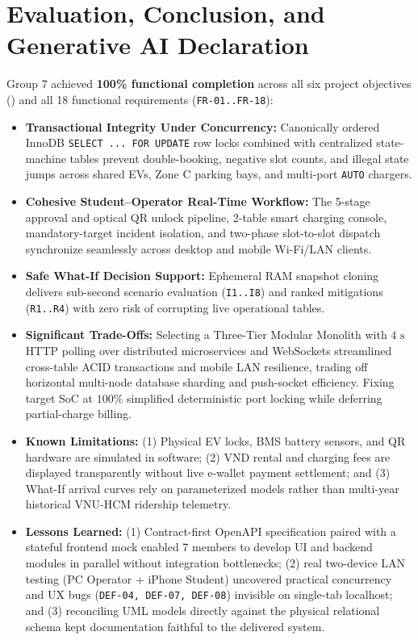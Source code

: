 \section{Evaluation, Conclusion, and Generative AI Declaration}
\label{sec:evaluation}

\label{subsec:evaluation-strengths}
Group 7 achieved \textbf{100\% functional completion} across all six project objectives () and all 18 functional requirements (\texttt{FR-01..FR-18}):
\begin{itemize}
  \item \textbf{Transactional Integrity Under Concurrency:} Canonically ordered InnoDB \texttt{SELECT ... FOR UPDATE} row locks combined with centralized state-machine tables prevent double-booking, negative slot counts, and illegal state jumps across shared EVs, Zone C parking bays, and multi-port \texttt{AUTO} chargers.
  \item \textbf{Cohesive Student--Operator Real-Time Workflow:} The 5-stage approval and optical QR unlock pipeline, 2-table smart charging console, mandatory-target incident isolation, and two-phase slot-to-slot dispatch synchronize seamlessly across desktop and mobile Wi-Fi/LAN clients.
  \item \textbf{Safe What-If Decision Support:} Ephemeral RAM snapshot cloning delivers sub-second scenario evaluation (\texttt{I1..I8}) and ranked mitigations (\texttt{R1..R4}) with zero risk of corrupting live operational tables.
\end{itemize}

\label{subsec:limitations-lessons}
\begin{itemize}
  \item \textbf{Significant Trade-Offs:} Selecting a Three-Tier Modular Monolith with $4\text{ s}$ HTTP polling over distributed microservices and WebSockets streamlined cross-table ACID transactions and mobile LAN resilience, trading off horizontal multi-node database sharding and push-socket efficiency. Fixing target SoC at $100\%$ simplified deterministic port locking while deferring partial-charge billing.
  \item \textbf{Known Limitations:} (1) Physical EV locks, BMS battery sensors, and QR hardware are simulated in software; (2) VND rental and charging fees are displayed transparently without live e-wallet payment settlement; and (3) What-If arrival curves rely on parameterized models rather than multi-year historical VNU-HCM ridership telemetry.
  \item \textbf{Lessons Learned:} (1) Contract-first OpenAPI specification paired with a stateful frontend mock enabled 7 members to develop UI and backend modules in parallel without integration bottlenecks; (2) real two-device LAN testing (PC Operator + iPhone Student) uncovered practical concurrency and UX bugs (\texttt{DEF-04, DEF-07, DEF-08}) invisible on single-tab localhost; and (3) reconciling UML models directly against the physical relational schema kept documentation faithful to the delivered system.
\end{itemize}

